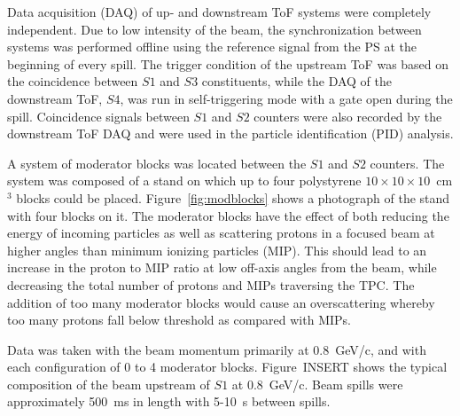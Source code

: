     
    Data acquisition (DAQ) of up- and downstream ToF systems were completely independent. Due to low intensity of the beam, the synchronization between systems was performed offline using the reference signal from the PS at the beginning of every spill. The trigger condition of the upstream ToF was based on the coincidence between $S1$ and $S3$ constituents, while the DAQ of the downstream ToF, $S4$, was run in self-triggering mode with a gate open during the spill. Coincidence signals between $S1$ and $S2$ counters were also recorded by the downstream ToF DAQ and were used in the particle identification (PID) analysis. 
    
    
    A system of moderator blocks was located between the $S1$ and $S2$ counters.  The system was composed of a stand on which up to four polystyrene $10\times10\times10$~cm$^3$ blocks could be placed. Figure~\ref{fig:modblocks} shows a photograph of the stand with four blocks on it. The moderator blocks have the effect of both reducing the energy of incoming particles as well as scattering protons in a focused beam at higher angles than minimum ionizing particles (MIP). This should lead to an  increase in the proton to MIP ratio at low off-axis angles from the beam, while decreasing the total number of protons and MIPs traversing the TPC. The addition of too many moderator blocks would cause an overscattering whereby too many protons fall below threshold as compared with MIPs.
    
    Data was taken with the beam momentum primarily at 0.8~GeV/c, and with each configuration of 0 to 4 moderator blocks. Figure~INSERT shows the typical composition of the beam upstream of $S1$ at 0.8~GeV/c. Beam spills were approximately 500~ms in length with 5-10~s between spills.  
    
    
